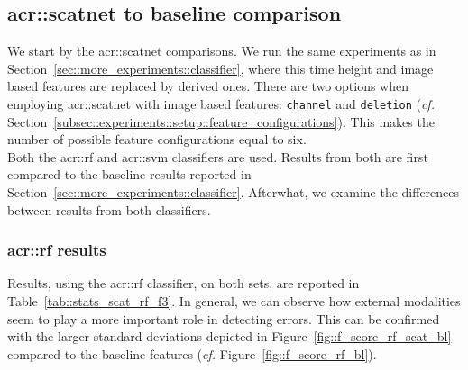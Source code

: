     \subsection{\texorpdfstring{\acrshort*{acr::scatnet}}{ScatNet} to baseline comparison}
        \label{subsec::more_experiments::richer_features::scatnet_baseline}
        We start by the \gls{acr::scatnet} comparisons.
        We run the same experiments as in Section~\ref{sec::more_experiments::classifier}, where this time height and image based features are replaced by derived ones.
        There are two options when employing \gls{acr::scatnet} with image based features: \texttt{channel} and \texttt{deletion} (\textit{cf.} Section~\ref{subsec::experiments::setup::feature_configurations}).
        This makes the number of possible feature configurations equal to six.\\

        Both the \gls{acr::rf} and \gls{acr::svm} classifiers are used.
        Results from both are first compared to the baseline results reported in Section~\ref{sec::more_experiments::classifier}.
        Afterwhat, we examine the differences between results from both classifiers.

        \subsubsection{\texorpdfstring{\acrshort*{acr::rf}}{RF} results}
            \label{subsubsec::more_experiments::richer_features::scatnet_baseline::rf}
            Results, using the \gls{acr::rf} classifier, on both sets, are reported in Table~\ref{tab::stats_scat_rf_f3}.
            In general, we can observe how external modalities seem to play a more important role in detecting errors.
            This can be confirmed with the larger standard deviations depicted in Figure~\ref{fig::f_score_rf_scat_bl} compared to the baseline features (\textit{cf.} Figure~\ref{fig::f_score_rf_bl}).\\

